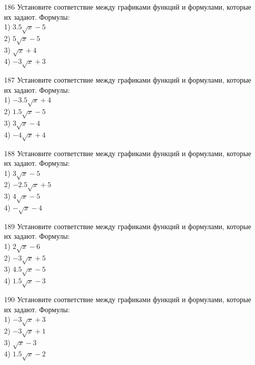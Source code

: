 \documentclass[4apaper]{article}
\begin{document}
\begin{taskBN}{186}
Установите соответствие между графиками функций и формулами, которые их задают. Формулы: \\1) $3.5\sqrt{x}-5$\\2) $5\sqrt{x}-5$\\3) $\sqrt{x}+4$\\4) $-3\sqrt{x}+3$
\end{taskBN}

\begin{taskBN}{187}
Установите соответствие между графиками функций и формулами, которые их задают. Формулы: \\1) $-3.5\sqrt{x}+4$\\2) $1.5\sqrt{x}-5$\\3) $3\sqrt{x}-4$\\4) $-4\sqrt{x}+4$
\end{taskBN}

\begin{taskBN}{188}
Установите соответствие между графиками функций и формулами, которые их задают. Формулы: \\1) $3\sqrt{x}-5$\\2) $-2.5\sqrt{x}+5$\\3) $4\sqrt{x}-5$\\4) $-\sqrt{x}-4$
\end{taskBN}

\begin{taskBN}{189}
Установите соответствие между графиками функций и формулами, которые их задают. Формулы: \\1) $2\sqrt{x}-6$\\2) $-3\sqrt{x}+5$\\3) $4.5\sqrt{x}-5$\\4) $1.5\sqrt{x}-3$
\end{taskBN}

\begin{taskBN}{190}
Установите соответствие между графиками функций и формулами, которые их задают. Формулы: \\1) $-3\sqrt{x}+3$\\2) $-3\sqrt{x}+1$\\3) $\sqrt{x}-3$\\4) $1.5\sqrt{x}-2$
\end{taskBN}
\end{document}
